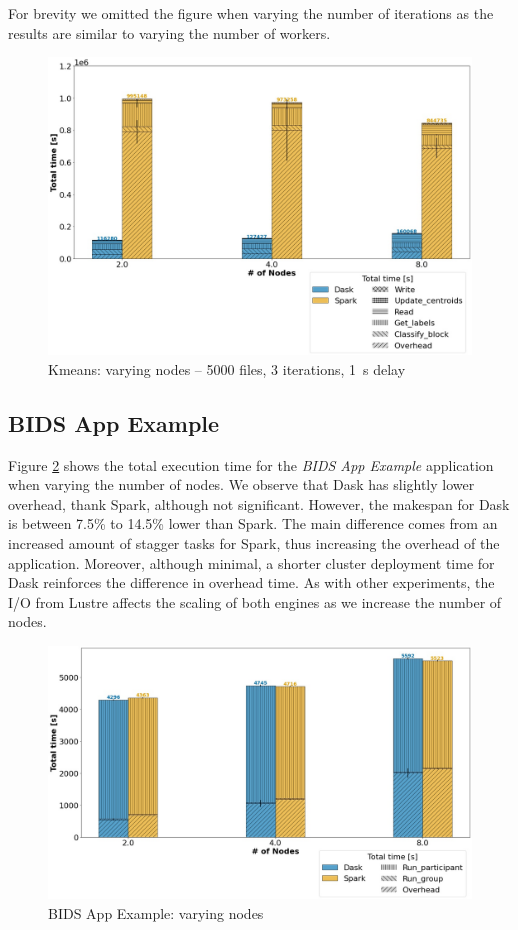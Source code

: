\documentclass[conference]{IEEEtran}
\begin{document}
For brevity we omitted the figure when varying the number of iterations as the results are similar to varying the number of workers.
\begin{figure}[!t]
	\centering
	\includegraphics[clip,width=\columnwidth]{figures/stacked_kmeans_worker.jpg}
	\caption{Kmeans: varying nodes -- 5000 files, 3 iterations, \SI{1}{\second} delay}
	\label{fig:kmeans_worker}
\end{figure}

\subsection{BIDS App Example}
Figure \ref{fig:bids} shows the total execution time for the \textit{BIDS App Example} application when varying the number of nodes.
We observe that Dask has slightly lower overhead, thank Spark, although not significant.
However, the makespan for Dask is between 7.5\% to 14.5\% lower than Spark.
The main difference comes from an increased amount of stagger tasks for Spark, thus increasing the overhead of the application.
Moreover, although minimal, a shorter cluster deployment time for Dask reinforces the difference in overhead time.
As with other experiments, the I/O from Lustre affects the scaling of both engines as we increase the number of nodes.
\begin{figure}[!t]
	\centering
	\includegraphics[clip,width=\columnwidth]{figures/stacked_bids.jpg}
	\caption{BIDS App Example: varying nodes}
	\label{fig:bids}
\end{figure}
\end{document}
